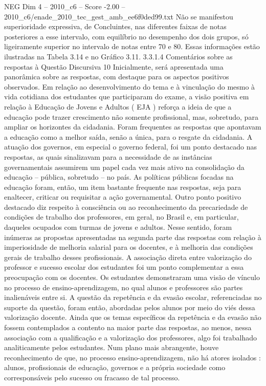\begin{textsample}{NEG Dim 4 – 2010\_c6 – Score -2.00 – 2010\_c6/enade\_2010\_tec\_gest\_amb\_ee6f0ded99.txt}
Não se manifestou superioridade expressiva, de Concluintes, nas diferentes faixas de notas posteriores a esse intervalo, com equilíbrio no desempenho dos dois grupos, só ligeiramente superior no intervalo de notas entre 70 e 80.
Essas informações estão ilustradas na Tabela 3.14 e no Gráfico 3.11. 3.3.1.4 Comentários sobre as respostas à Questão Discursiva 10 Inicialmente, será apresentada uma panorâmica sobre as respostas, com destaque para os aspectos positivos observados.
Em relação ao desenvolvimento do tema e à vinculação do mesmo à vida cotidiana dos estudantes que participaram do exame, a visão positiva em relação à Educação de Jovens e Adultos ( EJA ) reforça a ideia de que a educação pode trazer crescimento não somente profissional, mas, sobretudo, para ampliar os horizontes da cidadania.
Foram frequentes as respostas que apontavam a educação como a melhor saída, senão a única, para o resgate da cidadania.
A atuação dos governos, em especial o governo federal, foi um ponto destacado nas respostas, as quais sinalizavam para a necessidade de as instâncias governamentais assumirem um papel cada vez mais ativo na consolidação da educação – pública, sobretudo – no país.
As políticas públicas focadas na educação foram, então, um item bastante frequente nas respostas, seja para enaltecer, criticar ou requisitar a ação governamental.
Outro ponto positivo destacado diz respeito à consciência ou ao reconhecimento da precariedade de condições de trabalho dos professores, em geral, no Brasil e, em particular, daqueles ocupados com turmas de jovens e adultos.
Nesse sentido, foram inúmeras as propostas apresentadas na segunda parte das respostas com relação à imperiosidade de melhoria salarial para os docentes, e à melhoria das condições gerais de trabalho desses profissionais.
A associação direta entre valorização do professor e sucesso escolar dos estudantes foi um ponto complementar a essa preocupação com os docentes.
Os estudantes demonstraram uma visão de vínculo no processo de ensino-aprendizagem, no qual alunos e professores são partes inalienáveis entre si.
A questão da repetência e da evasão escolar, referenciadas no suporte da questão, foram então, abordadas pelos alunos por meio do viés dessa valorização docente.
Ainda que os temas específicos da repetência e da evasão não fossem contemplados a contento na maior parte das respostas, ao menos, nessa associação com a qualificação e a valorização dos professores, algo foi trabalhado analiticamente pelos estudantes.
Num plano mais abrangente, houve reconhecimento de que, no processo ensino-aprendizagem, não há atores isolados : alunos, profissionais de educação, governos e a própria sociedade como corresponsáveis pelo sucesso ou fracasso de tal processo.

\end{textsample}
